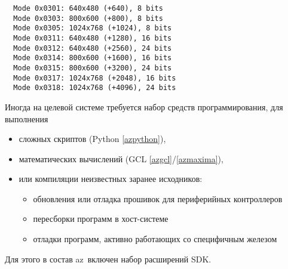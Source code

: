 \begin{verbatim}
  Mode 0x0301: 640x480 (+640), 8 bits
  Mode 0x0303: 800x600 (+800), 8 bits
  Mode 0x0305: 1024x768 (+1024), 8 bits
  Mode 0x0311: 640x480 (+1280), 16 bits
  Mode 0x0312: 640x480 (+2560), 24 bits
  Mode 0x0314: 800x600 (+1600), 16 bits
  Mode 0x0315: 800x600 (+3200), 24 bits
  Mode 0x0317: 1024x768 (+2048), 16 bits
  Mode 0x0318: 1024x768 (+4096), 24 bits
\end{verbatim}

\secup

 \label{aznetboot}

 \label{azfirmware}


\secdown

\label{azblas}

\label{azlapack}

\label{azoctave}

\label{azmaxima}

\secup

\secdown

Иногда на целевой системе требуется набор средств программирования, для
выполнения

\begin{itemize}[nosep]
  \item
сложных скриптов (Python \ref{azpython}),
  \item
математических вычислений (GCL \ref{azgcl}/\ref{azmaxima}),
  \item
или компиляции неизвестных заранее исходников:
\begin{itemize}[nosep]
 \item обновления или отладка прошивок для периферийных контроллеров
 \item пересборки программ в хост-системе
 \item отладки программ, активно работающих со специфичным железом
\end{itemize}
\end{itemize}

Для этого в состав az\linux\ включен набор расширений SDK.

